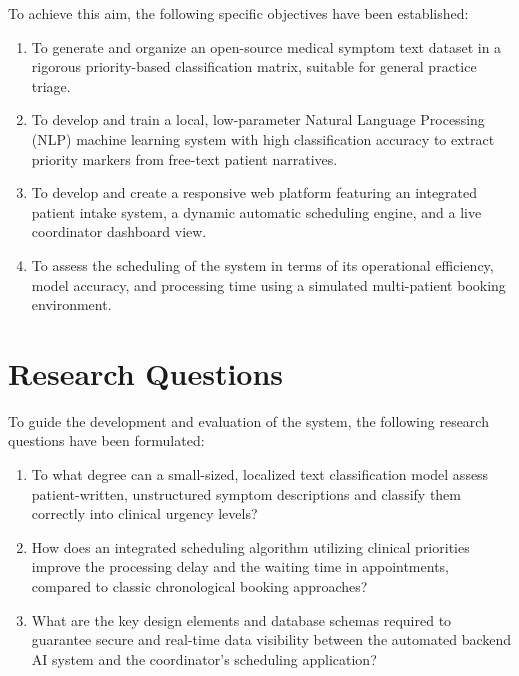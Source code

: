 \documentclass[12pt,a4paper]{report}
\begin{document}
To achieve this aim, the following specific objectives have been established:
\begin{enumerate}
    \item To generate and organize an open-source medical symptom text dataset in a rigorous priority-based classification matrix, suitable for general practice triage.
    \item To develop and train a local, low-parameter Natural Language Processing (NLP) machine learning system with high classification accuracy to extract priority markers from free-text patient narratives.
    \item To develop and create a responsive web platform featuring an integrated patient intake system, a dynamic automatic scheduling engine, and a live coordinator dashboard view.
    \item To assess the scheduling of the system in terms of its operational efficiency, model accuracy, and processing time using a simulated multi-patient booking environment.
\end{enumerate}

\section{Research Questions}
To guide the development and evaluation of the system, the following research questions have been formulated:
\begin{enumerate}
    \item To what degree can a small-sized, localized text classification model assess patient-written, unstructured symptom descriptions and classify them correctly into clinical urgency levels?
    \item How does an integrated scheduling algorithm utilizing clinical priorities improve the processing delay and the waiting time in appointments, compared to classic chronological booking approaches?
    \item What are the key design elements and database schemas required to guarantee secure and real-time data visibility between the automated backend AI system and the coordinator's scheduling application?
\end{enumerate}
\end{document}
